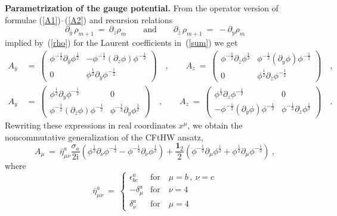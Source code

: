 \documentclass[a4paper,11pt]{article}
\numberwithin{equation}{section}
\def\de{\delta}
\def\eps{\epsilon}
\def\r{\rho}
\def\s{\sigma}
\def\p{\phi}
\def\i{\mbox{i}}
\def\pa{\mbox{$\partial$}}
\begin{document}
\noindent
{\bf Parametrization of the gauge potential.} 
{}From the operator version of formulae (\ref{A1})--(\ref{A2}) and 
recursion relations 
\begin{equation}\label{rel}
\pa_{\bar y}\,\r_{m+1}\ =\ \pa_z\r_m \qquad\mbox{and}\qquad
\pa_{\bar z}\,\r_{m+1}\ =\ -\pa_y\r_m
\end{equation}
implied by~(\ref{rho}) for the Laurent coefficients in~(\ref{sum})
we get
\begin{align}
A_{\bar y}\ &=\ \begin{pmatrix}
\phi^{-\frac{1}{2}}\pa_{\bar y}\phi^{\frac{1}{2}} &
-\phi^{-\frac{1}{2}} (\pa_{z}\phi )\phi^{-\frac{1}{2}} \\ 
0 &
\phi^{\frac{1}{2}}\pa_{\bar y}\phi^{-\frac{1}{2}}
\end{pmatrix} \quad ,\qquad
A_{\bar z}\ =\ \begin{pmatrix}
\phi^{-\frac{1}{2}}\pa_{\bar z}\phi^{\frac{1}{2}} &
\phi^{-\frac{1}{2}} (\pa_{y}\phi )\phi^{-\frac{1}{2}} \\ 
0 &
\phi^{\frac{1}{2}}\pa_{\bar z}\phi^{-\frac{1}{2}}
\end{pmatrix} \quad, \nonumber \\[8pt] \label{ncgen}
A_{y}\ &=\ \begin{pmatrix}
\phi^{\frac{1}{2}}\pa_{y}\phi^{-\frac{1}{2}} &
0 \\
\phi^{-\frac{1}{2}}(\pa_{\bar z}\phi )\phi^{-\frac{1}{2}} &
\phi^{-\frac{1}{2}}\pa_{y}\phi^{\frac{1}{2}}
\end{pmatrix} \quad ,\qquad
A_{z}\ =\ \begin{pmatrix}
\phi^{\frac{1}{2}}\pa_{z}\phi^{-\frac{1}{2}} &
0 \\ 
-\phi^{-\frac{1}{2}}(\pa_{\bar y}\phi )\phi^{-\frac{1}{2}} &
\phi^{-\frac{1}{2}}\pa_{z}\phi^{\frac{1}{2}}
\end{pmatrix} \quad.
\end{align}
Rewriting these expressions in real coordinates $x^\mu$, we obtain
the noncommutative generalization of the CFtHW ansatz,
\begin{equation}\label{Amu}
A_\mu\ =\ \bar\eta^a_{\mu\nu}\frac{\s_a}{2\i}
\left(\p^{\frac12}\pa_\nu\p^{-\frac12}-\p^{-\frac12}\pa_\nu\p^{\frac12}\right)
+ \frac{{\mathbf 1}_2}{2}
\left(\p^{-\frac12}\pa_\mu\p^{\frac12}+\p^{\frac12}\pa_\mu\p^{-\frac12}\right)
\ ,
\end{equation}
where
\begin{equation}
\bar\eta^a_{\mu\nu}\ =\ \begin{cases}
\eps^a_{bc} & \textrm{for} \quad \mu =b\,,\ \nu =c \\
-\de^a_\mu  & \textrm{for} \quad \nu =4 \\
\de^a_\nu   & \textrm{for} \quad \mu =4 \end{cases}
\end{equation}
\end{document}
